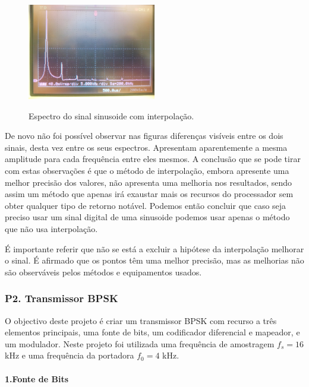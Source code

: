 \documentclass[11pt]{article}
\numberwithin{equation}{section}
\begin{document}
\begin{figure}[H]
	\centering
	\includegraphics[width=0.5\textwidth]{./P1-8_espect_c_interp}~\\
	\caption{Espectro do sinal sinusoide com interpolação.}
	\label{fig:espect_c_interp}
\end{figure}

De novo não foi possível observar nas figuras diferenças visíveis entre os dois sinais, desta vez entre os seus espectros. Apresentam aparentemente a mesma amplitude para cada frequência entre eles mesmos.
A conclusão que se pode tirar com estas observações é que o método de interpolação, embora apresente uma melhor precisão dos valores, não apresenta uma melhoria nos resultados, sendo assim um método que apenas irá exaustar mais os recursos do processador sem obter qualquer tipo de retorno notável. Podemos então concluir que caso seja preciso usar um sinal digital de uma sinusoide podemos usar apenas o método que não usa interpolação.

É importante referir que não se está a excluir a hipótese da interpolação melhorar o sinal. É afirmado que os pontos têm uma melhor precisão, mas as melhorias não são observáveis pelos métodos e equipamentos usados.

\subsubsection{P2. Transmissor BPSK}

O objectivo deste projeto é criar um transmissor BPSK com recurso a três elementos principais, uma fonte de bits, um codificador diferencial e mapeador, e um modulador.
Neste projeto foi utilizada uma frequência de amostragem $f_s=16$ kHz e uma frequência da portadora $f_0=4$ kHz.

\paragraph{1.Fonte de Bits} \hspace{0pt}
\end{document}
